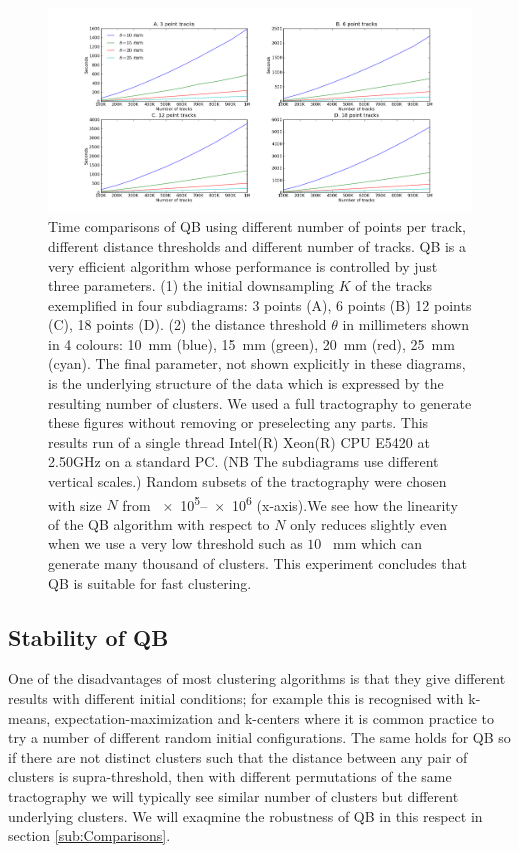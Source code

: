 \documentclass[preprint,authoryear,a4paper,10pt,onecolumn]{elsarticle}
\begin{document}
\begin{figure}
\noindent \begin{centering}
\includegraphics[scale=0.33]{2x2+leg-box}
\par\end{centering}
\caption{Time comparisons of QB using different number of points per
  track, different distance thresholds and different number of
  tracks. QB is a very efficient algorithm whose performance is
  controlled by just three parameters. (1) the initial downsampling $K$
  of the tracks exemplified in four subdiagrams: 3 points (A), 6 points
  (B) 12 points (C), 18 points (D). (2) the distance threshold $\theta$
  in millimeters shown in 4 colours: 10~mm (blue), 15~mm (green), 20~mm
  (red), 25~mm (cyan). The final parameter, not shown explicitly in
  these diagrams, is the underlying structure of the data which is
  expressed by the resulting number of clusters.  We used a full
  tractography to generate these figures without removing or
  preselecting any parts. This results run of a single thread Intel(R)
  Xeon(R) CPU E5420 at 2.50GHz on a standard PC. (NB The subdiagrams use
  different vertical scales.) Random subsets of the tractography were
  chosen with size $N$ from \numrange{e5}{e6} (x-axis).We see how the
  linearity of the QB algorithm with respect to $N$ only reduces
  slightly even when we use a very low threshold such as $10$ ~mm which
  can generate many thousand of clusters. This experiment concludes that
  QB is suitable for fast clustering.\label{Flo:Speed1}}
\end{figure}

\subsection{Stability of QB\label{sub:Comparisons}}

One of the disadvantages of most clustering algorithms is that they give
different results with different initial conditions; for example this is
recognised with k-means, expectation-maximization
\citep{dempster1977maximum} and k-centers \citep{gonzalez1985clustering}
where it is common practice to try a number of different random initial
configurations. The same holds for QB so if there are not distinct
clusters such that the distance between any pair of clusters is
supra-threshold, then with different permutations of the same
tractography we will typically see similar number of clusters but
different underlying clusters. We will exaqmine the robustness of QB in
this respect in section \ref{sub:Comparisons}.
\end{document}
